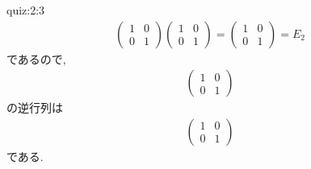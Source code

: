\begin{answerof}{quiz:2:3}
  \begin{align*}
    \begin{pmatrix}
      1&0\\0&1
    \end{pmatrix}
    \begin{pmatrix}
      1&0\\0&1
    \end{pmatrix}=
    \begin{pmatrix}
      1&0\\0&1
    \end{pmatrix}
    =E_2
  \end{align*}
  であるので,
  \begin{align*}
      \begin{pmatrix}
      1&0\\0&1
    \end{pmatrix}
  \end{align*}
  の逆行列は
  \begin{align*}
      \begin{pmatrix}
      1&0\\0&1
    \end{pmatrix}
  \end{align*}
  である.
\end{answerof}


